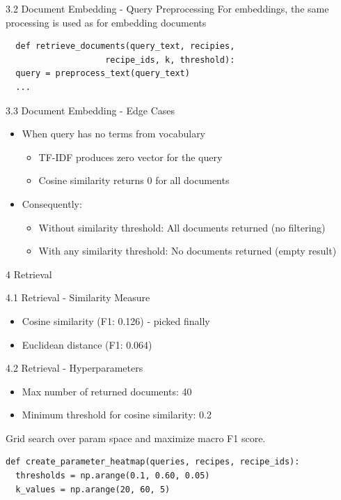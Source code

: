 \documentclass{beamer}
\begin{document}
\begin{frame}[fragile]{3.2 Document Embedding - Query Preprocessing}
  For embeddings, the same processing is used as for embedding documents
  \begin{verbatim}
  def retrieve_documents(query_text, recipies,
                    recipe_ids, k, threshold):
  query = preprocess_text(query_text)
  ...
    \end{verbatim}
\end{frame}

\begin{frame}{3.3 Document Embedding - Edge Cases}
  \begin{itemize}
    \item When query has no terms from vocabulary
          \begin{itemize}
            \item TF-IDF produces zero vector for the query
            \item Cosine similarity returns 0 for all documents
          \end{itemize}
    \item Consequently:
          \begin{itemize}
            \item Without similarity threshold: All documents returned (no filtering)
            \item With any similarity threshold: No documents returned (empty result)
          \end{itemize}
  \end{itemize}
\end{frame}

\begin{frame}{4 Retrieval}
\end{frame}

\begin{frame}{4.1 Retrieval - Similarity Measure}
  \begin{itemize}
    \item Cosine similarity (F1: 0.126) - picked finally
    \item Euclidean distance (F1: 0.064)
  \end{itemize}
\end{frame}

\begin{frame}[fragile]{4.2 Retrieval - Hyperparameters}
  \begin{itemize}
    \item Max number of returned documents: 40
    \item Minimum threshold for cosine similarity: 0.2
  \end{itemize}
  Grid search over param space and maximize macro F1 score.

  \begin{verbatim}
def create_parameter_heatmap(queries, recipes, recipe_ids):
  thresholds = np.arange(0.1, 0.60, 0.05)
  k_values = np.arange(20, 60, 5)
  \end{verbatim}

\end{frame}
\end{document}
